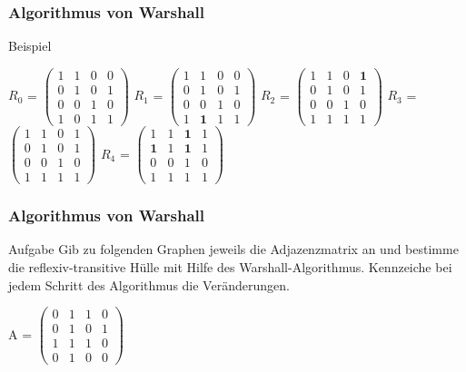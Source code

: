 \documentclass{beamer}
\begin{document}
\begin{frame}
	\frametitle{Algorithmus von Warshall}
	\begin{block}{Beispiel}
		\begin{center}
			$R_0$ =	
			$\begin{pmatrix}
				 1 & 1 & 0 & 0\\
				 0 & 1 & 0 & 1\\
				 0 & 0 & 1 & 0\\
				 1 & 0 & 1 & 1
			\end{pmatrix}$
			$R_1$ =	
			$\begin{pmatrix}
				 1 & 1 & 0 & 0\\
				 0 & 1 & 0 & 1\\
				 0 & 0 & 1 & 0\\
				 1 & \mathbf{1} & 1 & 1
			\end{pmatrix}$
			$R_2$ =	
			$\begin{pmatrix}
				 1 & 1 & 0 & \mathbf{1}\\
				 0 & 1 & 0 & 1\\
				 0 & 0 & 1 & 0\\
				 1 & 1 & 1 & 1
			\end{pmatrix}$
			$R_3$ =	
			$\begin{pmatrix}
				 1 & 1 & 0 & 1\\
				 0 & 1 & 0 & 1\\
				 0 & 0 & 1 & 0\\
				 1 & 1 & 1 & 1
			\end{pmatrix}$
			$R_4$ =	
			$\begin{pmatrix}
				 1 & 1 & \mathbf{1} & 1\\
				 \mathbf{1} & 1 & \mathbf{1} & 1\\
				 0 & 0 & 1 & 0\\
				 1 & 1 & 1 & 1
			\end{pmatrix}$
		\end{center}
	\end{block}
\end{frame}

\begin{frame}
	\frametitle{Algorithmus von Warshall}
	\begin{block}{Aufgabe}
	Gib zu folgenden Graphen jeweils die Adjazenzmatrix an und bestimme die 
	reflexiv-transitive H\"ulle mit Hilfe des Warshall-Algorithmus. Kennzeiche 
	bei jedem Schritt des Algorithmus die Ver\"anderungen.
		\begin{center}		
			A =	
			$\begin{pmatrix}
				 0 & 1 & 1 & 0\\
				 0 & 1 & 0 & 1\\
				 1 & 1 & 1 & 0\\
				 0 & 1 & 0 & 0
			\end{pmatrix}$
		\end{center}
	\end{block}
\end{frame}
\end{document}
